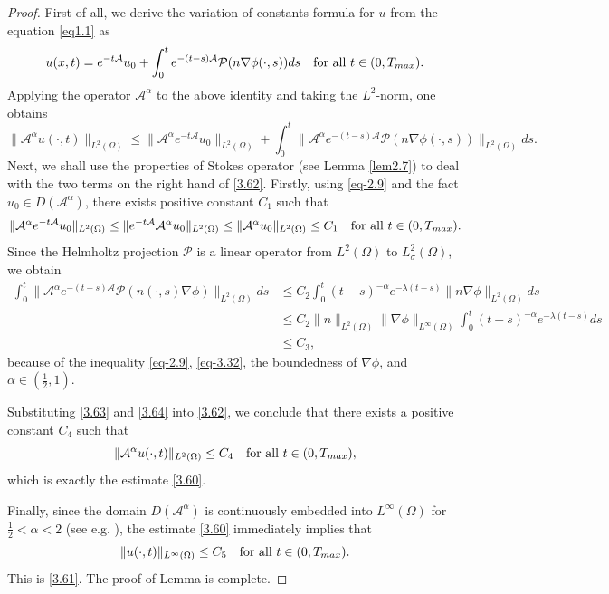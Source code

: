 \documentclass[10pt,a4paper]{amsart}
\numberwithin{equation}{section}
\begin{document}
\begin{proof} 
First of all, we derive the variation-of-constants formula for $u$ from the equation 
\eqref{eq1.1} as
\[
u(x,t) = e^{-t \mathcal{A}} u_0 + \int_{0}^t e^{-(t - s) \mathcal{A}} 
\mathcal{P}(n\nabla \phi(\cdot, s)) ds \quad \text{for all } t \in (0, T_{\rm max}).
\]
Applying the operator $\mathcal{A}^\alpha$ to the above identity and taking the 
$L^2$-norm, one obtains
\begin{equation} \label{3.62}
\| \mathcal{A}^\alpha u(\cdot, t) \|_{L^2(\Omega)}
\leq \| \mathcal{A}^\alpha e^{-t\mathcal{A}} u_0 \|_{L^2(\Omega)}
+ \int_0^t \|\mathcal{A}^{\alpha} e^{-(t - s)\mathcal{A}} \mathcal{P}(n \nabla
\phi(\cdot, s))\|_{L^2(\Omega)} ds.
\end{equation}
Next, we shall use the properties of Stokes operator (see Lemma \ref{lem2.7})
to deal with the two terms on the right hand of \eqref{3.62}. Firstly,
using \eqref{eq-2.9} and the fact $u_0 \in D(\mathcal{A}^\alpha)$, there exists
positive constant $C_1$ such that
\begin{equation}\label{3.63}
\|\mathcal{A}^\alpha e^{-t\mathcal{A}} u_0\|_{L^2(\Omega)}
\leq \| e^{-t\mathcal{A}}\mathcal{A}^\alpha u_0\|_{L^2(\Omega)}
 \leq \|\mathcal{A}^\alpha u_0\|_{L^2(\Omega)} \leq C_1 \quad \text{for
all } t \in (0, T_{\rm max}).
\end{equation}
Since the Helmholtz projection $\mathcal{P}$ is a linear operator from $L^2(\Omega)$
to $L_\sigma^2(\Omega)$, we obtain
\begin{equation}\label{3.64}
\begin{split}
\int_0^t \|\mathcal{A}^{\alpha} e^{-(t - s)\mathcal{A}} \mathcal{P}(n(\cdot, s)
  \nabla \phi)\|_{L^2(\Omega)} ds
&\le C_2  \int_0^t (t - s)^{-\alpha} e^{-\lambda (t - s)}
 \|n\nabla \phi\|_{L^2(\Omega)} ds\\
&\le C_2 \|n\|_{L^2(\Omega)} \|\nabla\phi\|_{L^\infty(\Omega)}
 \int_0^t (t - s)^{-\alpha} e^{-\lambda (t - s)} ds \\
& \le C_3,
\end{split}
\end{equation}
because of the inequality \eqref{eq-2.9}, \eqref{eq-3.32},  the boundedness of
$\nabla\phi$, and $\alpha\in (\frac{1}{2}, 1)$.

Substituting \eqref{3.63} and \eqref{3.64} into \eqref{3.62}, we conclude that there 
exists a positive constant $C_4$ such that
\[
\|\mathcal{A}^\alpha u(\cdot, t)\|_{L^2(\Omega)} \leq C_4 \quad 
\text{for all } t \in (0, T_{\rm max}),
\]
which is exactly the estimate \eqref{3.60}.

Finally, since the domain $D(\mathcal{A}^\alpha)$ is continuously embedded into 
$L^\infty(\Omega)$ for $\frac{1}{2}< \alpha<2$ (see e.g. \cite{Sohr-2001}),
the estimate \eqref{3.60} immediately implies that
\[
\| u(\cdot, t) \|_{L^\infty(\Omega)} \leq C_5 \quad \text{for all } 
t \in (0, T_{\rm max}).
\]
This is \eqref{3.61}.  The proof of Lemma is complete.
\end{proof}
\end{document}
